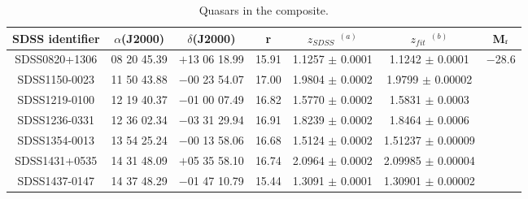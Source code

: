 \begin{table*}
\centering
\begin{center}
\caption{Quasars in the composite. \label{tab:targets}}
\begin{tabular}{ccccccc}
\hline
\noalign{\smallskip}
SDSS identifier & $\alpha$(J2000) & $\delta$(J2000) & r &  $z_{SDSS}$ $^{(a)}$  &  $z_{fit}$ $^{(b)}$ & M$_{\textnormal r}$\\  
\hline

SDSS0820+1306  & 08 20 45.39 & $+$13 06 18.99 & 15.91 & 1.1257 $\pm$ 0.0001 & 1.1242 $\pm$ 0.0001  &   $-$28.6     \\
SDSS1150-0023  & 11 50 43.88 & $-$00 23 54.07 & 17.00 & 1.9804 $\pm$ 0.0002 & 1.9799 $\pm$ 0.00002       \\
SDSS1219-0100  & 12 19 40.37& $-$01 00 07.49& 16.82 & 1.5770 $\pm$ 0.0002  & 1.5831 $\pm$ 0.0003       \\
SDSS1236-0331  & 12 36 02.34 & $-$03 31 29.94 & 16.91 & 1.8239 $\pm$ 0.0002   & 1.8464 $\pm$ 0.0006        \\
SDSS1354-0013  & 13 54 25.24 & $-$00 13 58.06 & 16.68 & 1.5124 $\pm$ 0.0002 & 1.51237 $\pm$  0.00009         \\
SDSS1431+0535  & 14 31 48.09 & $+$05 35 58.10 & 16.74 & 2.0964 $\pm$ 0.0002 & 2.09985 $\pm$  0.00004     \\
SDSS1437-0147  & 14 37 48.29 & $-$01 47 10.79 & 15.44 & 1.3091 $\pm$ 0.0001& 1.30901 $\pm$  0.00002        \\

\hline
\hline
\end{tabular}
\end{center}


\end{table*}



